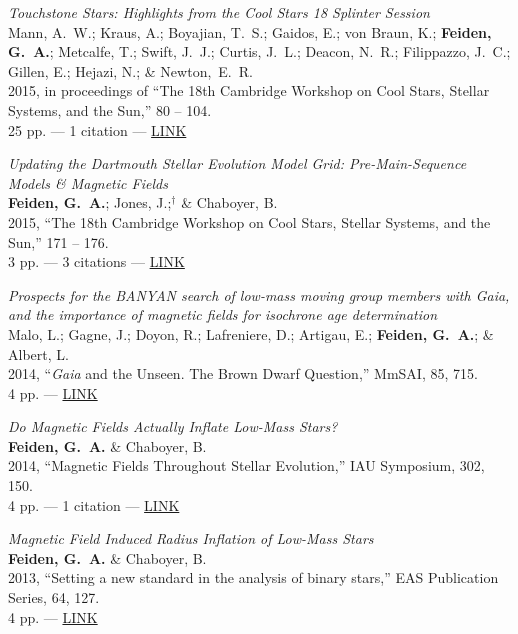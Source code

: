 \documentclass[12pt,letter]{article}
\begin{document}
\begin{etaremune}[leftmargin=0.30in]
	\item \emph{Touchstone Stars: Highlights from the Cool Stars 18 Splinter Session} \\
	 Mann, A.~W.; Kraus, A.; Boyajian, T.~S.; Gaidos, E.; von Braun, K.; {\bf Feiden, G.~A.}; Metcalfe, T.; Swift, J.~J.; Curtis, J.~L.; Deacon, N.~R.; Filippazzo, J.~C.; Gillen, E.; Hejazi, N.; \& Newton,~E.~R. \\
	 2015, in proceedings of ``The 18th Cambridge Workshop on Cool Stars, Stellar Systems, and the Sun,'' 80 -- 104. \\
	 25 pp. --- 1 citation --- \href{http://adsabs.harvard.edu/abs/2015csss...18..171F}{LINK}

	\item \emph{Updating the Dartmouth Stellar Evolution Model Grid: Pre-Main-Sequence Models \& Magnetic Fields} \\
	{\bf Feiden, G.~A.}; Jones, J.;$^{\dagger}$ \& Chaboyer, B. \\
	2015, ``The 18th Cambridge Workshop on Cool Stars, Stellar Systems, and the Sun,'' 171 -- 176. \\
	3 pp. --- 3 citations --- \href{http://adsabs.harvard.edu/abs/2015csss...18...80M}{LINK}
	
	\item \emph{Prospects for the BANYAN search of low-mass moving group members with Gaia, and the importance of magnetic fields for isochrone age determination} \\
		Malo, L.; Gagne, J.; Doyon, R.; Lafreniere, D.; Artigau, E.; {\bf Feiden, G.~A.}; \& Albert, L. \\
		2014, ``{\it Gaia} and the Unseen. The Brown Dwarf Question,'' MmSAI, 85, 715. \\
		4 pp. --- \href{http://adsabs.harvard.edu/abs/2014MmSAI..85..715M}{LINK}
		
	\item \emph{Do Magnetic Fields Actually Inflate Low-Mass Stars?} \\
    {\bf Feiden, G.~A.} \& Chaboyer, B. \\
    2014, ``Magnetic Fields Throughout Stellar Evolution,'' IAU Symposium, 302, 150. \\
    4 pp. --- 1 citation --- \href{http://adsabs.harvard.edu/abs/2014IAUS..302..150F}{LINK}

    \item \emph{Magnetic Field Induced Radius Inflation of Low-Mass Stars} \\ 
    {\bf Feiden, G.~A.} \& Chaboyer, B. \\
    2013, ``Setting a new standard in the analysis of binary stars,'' EAS Publication Series, 64, 127. \\
    4 pp. --- \href{http://adsabs.harvard.edu/abs/2013EAS....64..127F/}{LINK}
    

\end{etaremune}
\end{document}
